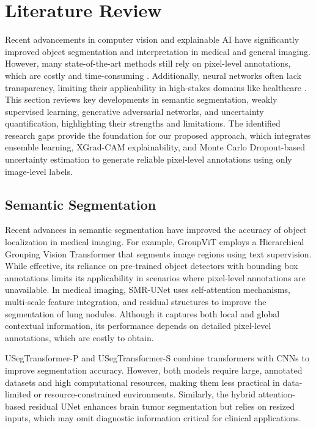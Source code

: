 \section{Literature Review}
Recent advancements in computer vision and explainable AI have significantly improved object segmentation and interpretation in medical and general imaging. However, many state-of-the-art methods still rely on pixel-level annotations, which are costly and time-consuming \cite{Rahimi21}. Additionally, neural networks often lack transparency, limiting their applicability in high-stakes domains like healthcare \cite{alzubaidi2023towards}. This section reviews key developments in semantic segmentation, weakly supervised learning, generative adversarial networks, and uncertainty quantification, highlighting their strengths and limitations. The identified research gaps provide the foundation for our proposed approach, which integrates ensemble learning, XGrad-CAM explainability, and Monte Carlo Dropout-based uncertainty estimation to generate reliable pixel-level annotations using only image-level labels.

\subsection{Semantic Segmentation}

Recent advances in semantic segmentation have improved the accuracy of object localization in medical imaging. For example, GroupViT \cite{ref12} employs a Hierarchical Grouping Vision Transformer that segments image regions using text supervision. While effective, its reliance on pre-trained object detectors with bounding box annotations limits its applicability in scenarios where pixel-level annotations are unavailable. In medical imaging, SMR-UNet \cite{ref13} uses self-attention mechanisms, multi-scale feature integration, and residual structures to improve the segmentation of lung nodules. Although it captures both local and global contextual information, its performance depends on detailed pixel-level annotations, which are costly to obtain.

USegTransformer-P and USegTransformer-S \cite{ref14} combine transformers with CNNs to improve segmentation accuracy. However, both models require large, annotated datasets and high computational resources, making them less practical in data-limited or resource-constrained environments. Similarly, the hybrid attention-based residual UNet \cite{ref15} enhances brain tumor segmentation but relies on resized inputs, which may omit diagnostic information critical for clinical applications.

